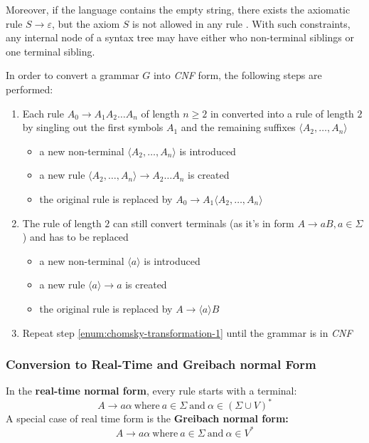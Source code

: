 \documentclass[english]{article}
\begin{document}
Moreover, if the language contains the empty string, there exists the axiomatic rule \(S \rightarrow \varepsilon\), but the axiom \(S\) is not allowed in any rule \RP.
With such constraints, any internal node of a syntax tree may have either who non-terminal siblings or one terminal sibling.

In order to convert a grammar \(G\) into \textit{CNF} form, the following steps are performed:

\begin{enumerate}[label=\arabic*., ref=(\arabic*)]
  \item\label{enum:chomsky-transformation-1} Each rule \(A_0 \rightarrow A_1 A_2 \ldots A_n\) of length \(n \geq 2\) in converted into a rule of length \(2\) by singling out the first symbols \(A_1\) and the remaining suffixes \(\langle A_2, \ldots, A_n \rangle\)
  \begin{itemize}
    \item a new non-terminal \(\langle A_2, \ldots, A_n \rangle\) is introduced
    \item a new rule \(\langle A_2, \ldots, A_n \rangle \rightarrow A_2 \ldots A_n\) is created
    \item the original rule is replaced by \(A_0 \rightarrow A_1 \langle A_2, \ldots, A_n \rangle\)
  \end{itemize}
  \item The rule of length \(2\) can still convert terminals (as it's in form \(A \rightarrow aB, a \in \Sigma\)) and has to be replaced
        \begin{itemize}
          \item a new non-terminal \(\langle a \rangle\) is introduced
          \item a new rule \(\langle a \rangle \rightarrow a\) is created
          \item the original rule is replaced by \(A \rightarrow \langle a \rangle B\)
        \end{itemize}
  \item Repeat step \ref{enum:chomsky-transformation-1} until the grammar is in \textit{CNF}
\end{enumerate}

\subsubsection{Conversion to Real-Time and Greibach normal Form}
\label{sec:conversion-to-greibach-and-real-time-normal-form}

In the \textbf{real-time normal form}, every rule starts with a terminal:
\[A \rightarrow a \alpha \ \text{where} \ a \in \Sigma \ \text{and} \ \alpha \in \left( \Sigma \cup V \right)^\ast \]
A special case of real time form is the \textbf{Greibach normal form:}
\[ A \rightarrow a \alpha \ \text{where} \ a \in \Sigma \ \text{and} \ \alpha \in V^\ast \]
\end{document}
